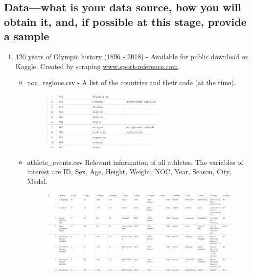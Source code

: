 \documentclass[a4 paper, 12pt]{memoir}
\begin{document}
\subsection*{Data—what is your data source, how you will obtain it, and, if possible at this stage, provide a sample}

    \begin{enumerate}
        \item \underline{120 years of Olympic history (1896 - 2018)} - 
        Available for public download on Kaggle. Created by scraping \url{www.sport-reference.com}.
            \begin{itemize}
                \item noc\_regions.csv - A list of the countries and their code (at the time). 
                    \begin{figure}[H]
                        \centering
                        \includegraphics[width=0.6\textwidth, frame]
                            {../images/noc_data.png}                    
                    \end{figure}
                \item athlete\_events.csv \- Relevant information of all athletes. The variables of interest are ID, Sex, Age, Height, Weight, NOC, Year, Season, City, Medal.
                    \begin{figure} [H]
                        \centering
                        \includegraphics[width=\textwidth, frame]
                            {../images/history_data.png}                    
                    \end{figure}               
            \end{itemize}


\end{enumerate}
\end{document}
